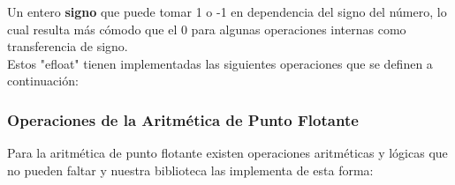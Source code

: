 \documentclass[a4paper,10pt,twocolumn]{article}
\begin{document}
	Un entero \textbf{signo} que puede tomar 1 o -1 en dependencia del signo del número, lo cual resulta más cómodo que el 0 para algunas operaciones internas como transferencia de signo.\\
	
	
	Estos "efloat" tienen implementadas las siguientes operaciones que se definen a continuación:
	
	
	\subsubsection{Operaciones de la Aritmética de Punto Flotante}
	
	Para la aritmética de punto flotante existen operaciones aritméticas y lógicas que no pueden faltar y nuestra biblioteca las implementa de esta forma: \\ 
\end{document}
